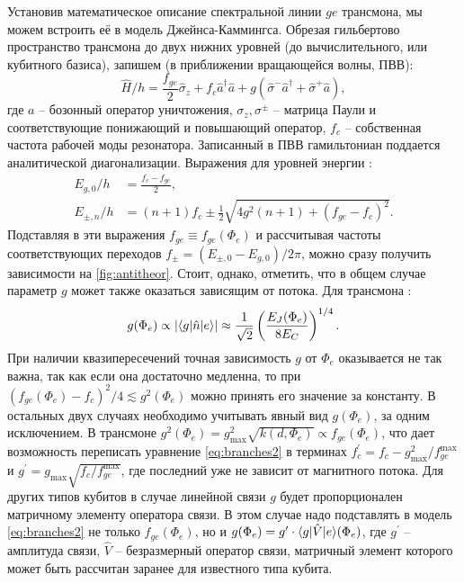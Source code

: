 \documentclass[14pt, a4paper]{extreport}
\DeclarePairedDelimiter\bra{\langle}{\rvert}
\DeclarePairedDelimiter\ket{\lvert}{\rangle}
\numberwithin{equation}{section}
\begin{document}
Установив математическое описание спектральной линии $ge$ трансмона, мы можем встроить её в модель Джейнса-Каммингса. Обрезая гильбертово пространство трансмона до двух нижних уровней (до вычислительного, или кубитного базиса), запишем (в приближении вращающейся волны, ПВВ):
\begin{equation}
	\hat H/h = \frac{f_{ge}}{2} \hat \sigma_z + f_c \hat a^\dagger \hat a + g(\hat \sigma^- \hat a^\dagger + \hat \sigma^+ \hat a),
\end{equation}
где $a$ -- бозонный оператор уничтожения, $\sigma_z, \sigma^\pm$ -- матрица Паули и соответствующие понижающий и повышающий оператор, $f_c$ -- собственная частота рабочей моды резонатора. Записанный в ПВВ гамильтониан поддается аналитической диагонализации. Выражения для уровней энергии \cite{blais2004cavity}:
\begin{align}
E_{g, 0}/h &= \frac{f_c - f_{ge}}{2},\label{eq:branches1}
\\
E_{\pm, n}/h &= (n+1)f_c \pm \frac{1}{2}\sqrt{4g^2(n+1)+(f_{ge}-f_c)^2}.
\label{eq:branches2}
\end{align}
Подставляя в эти выражения $f_{ge} \equiv f_{ge}(\Phi_e)$ и рассчитывая частоты соответствующих переходов $f_{\pm} = ( E_{\pm,0}-E_{g,0})/2\pi$, можно сразу получить зависимости на \autoref{fig:antitheor}. Стоит, однако, отметить, что в общем случае параметр $g$ может также оказаться зависящим от потока. Для трансмона \cite{koch2007charge, filipp2011multimode}:
\[
g(\Phi_e) \propto |\bra{g}\hat n \ket{e}| \approx \frac{1}{\sqrt{2}}\left(\frac{E_J(\Phi_e)}{8 E_C}\right)^{1/4}.\label{eq:g}
\]
При наличии квазипересечений точная зависимость $g$ от $\Phi_e$ оказывается не так важна, так как если она достаточно медленна, то при $(f_{ge}(\Phi_e) - f_c)^2/4 \lesssim g^2 (\Phi_e)$ можно принять его значение за константу. В остальных двух случаях необходимо учитывать явный вид $g(\Phi_e)$, за одним исключением. В трансмоне $g^2(\Phi_e) = g^2_{\text{max}}\sqrt{k(d, \Phi_e)} \propto f_{ge}(\Phi_e)$, что дает возможность переписать уравнение \eqref{eq:branches2} в терминах $f_c^\prime = f_c - g^2_{\text{max}}/f_{ge}^{\text{max}}$ и $g^\prime = g_\text{max}\sqrt{f_c/f_{ge}^\text{max}}$, где последний уже не зависит от магнитного потока. Для других типов кубитов в случае линейной связи $g$ будет пропорционален матричному элементу оператора связи. В этом случае надо подставлять в модель \eqref{eq:branches2} не только $f_{ge}(\Phi_e)$, но и $g(\Phi_e) = g^\prime\cdot \bra{g} \hat V \ket{e}(\Phi_e)$, где $g^\prime$ -- амплитуда связи, $\hat V$ -- безразмерный оператор связи, матричный элемент которого может быть рассчитан заранее для известного типа кубита.
\end{document}
